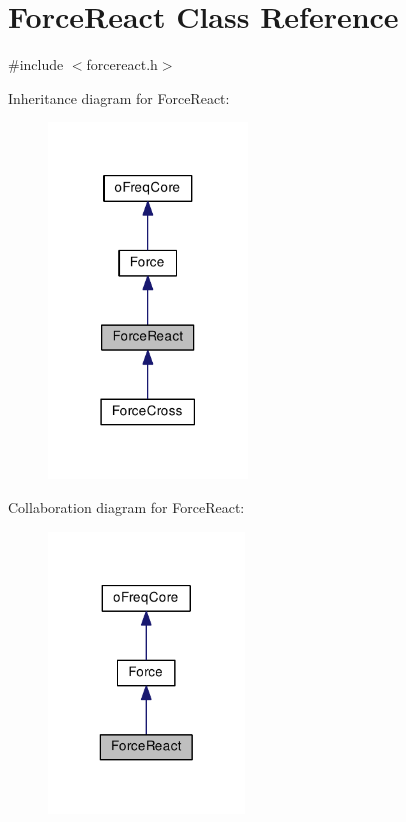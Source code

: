 \hypertarget{class_force_react}{\section{Force\-React Class Reference}
\label{class_force_react}
}


{\ttfamily \#include $<$forcereact.\-h$>$}



Inheritance diagram for Force\-React\-:\nopagebreak
\begin{figure}[H]
\begin{center}
\leavevmode
\includegraphics[width=150pt]{class_force_react__inherit__graph}
\end{center}
\end{figure}


Collaboration diagram for Force\-React\-:\nopagebreak
\begin{figure}[H]
\begin{center}
\leavevmode
\includegraphics[width=148pt]{class_force_react__coll__graph}
\end{center}
\end{figure}
